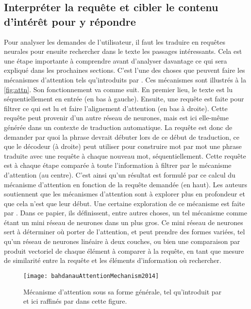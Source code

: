\subsection{Interpréter la requête et cibler le contenu d'intérêt pour y répondre}
\label{devel:qa}

Pour analyser les demandes de l'utilisateur, il faut les traduire en requêtes neurales pour ensuite rechercher dans le texte les passages intéressants. Cela est une étape importante à comprendre avant d'analyser davantage ce qui sera expliqué dans les prochaines sections. C'est l'une des choses que peuvent faire les mécanismes d'attention tels qu'introduits par \cite{attentionMechanism}. Ces mécanismes sont illustrés à la \autoref{fig:attn}. Son fonctionnement va comme suit. En premier lieu, le texte est lu séquentiellement en entrée (en bas à gauche). Ensuite, une requête est faite pour filtrer ce qui est lu et faire l'alignement d'attention (en bas à droite). Cette requête peut provenir d'un autre réseau de neurones, mais est ici elle-même générée dans un contexte de traduction automatique. La requête est donc de demander par quoi la phrase devrait débuter lors de ce début de traduction, ce que le décodeur (à droite) peut utiliser pour construire mot par mot une phrase traduite avec une requête à chaque nouveau mot, séquentiellement. Cette requête est à chaque étape comparée à toute l'information à filtrer par le mécanisme d'attention (au centre). C'est ainsi qu'un résultat est formulé par ce calcul du mécanisme d'attention en fonction de la requête demandée (en haut). Les auteurs soutiennent que les mécanismes d'attention sont à explorer plus en profondeur et que cela n'est que leur début. Une certaine exploration de ce mécanisme est faite par \cite{attentionBasedApproaches}. Dans ce papier, ils définissent, entre autres choses, un tel mécanisme comme étant un mini réseau de neurones dans un plus gros. Ce mini réseau de neurones sert à déterminer où porter de l'attention, et peut prendre des formes variées, tel qu'un réseau de neurones linéaire à deux couches, ou bien une comparaison par produit vectoriel de chaque élément à comparer à la requête, en tant que mesure de similarité entre la requête et les éléments d'information où rechercher. \\

\begin{figure*}
  \centering
  \texttt{[image: bahdanauAttentionMechanism2014]}
  \caption{Mécanisme d'attention sous sa forme générale, tel qu'introduit par \cite{attentionMechanism} et ici raffinés par \cite{attentionBasedApproaches} dans cette figure.}
  \label{fig:attn}
\end{figure*}

